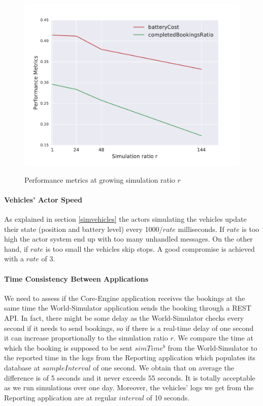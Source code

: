 \documentclass[12pt,a4paper]{article}
\begin{document}
\begin{figure}[h] 
  \centering
  \caption{Performance metrics at growing simulation ratio $r$}
  \vspace{-0.5em}
\includegraphics[scale=0.7]{./images/stability.pdf}
\label{fig:stability}
\end{figure}

\paragraph{Vehicles' Actor Speed} As explained in section \ref{simvehicles} the actors simulating the vehicles update their state (position and battery level) every 1000/$rate$ milliseconds. If $rate$ is too high the actor system end up with too many unhandled messages. On the other hand, if $rate$ is too small the vehicles skip stops. A good compromise is achieved with a $rate$ of 3.

\paragraph{Time Consistency Between Applications} We need to assess if the Core-Engine application receives the bookings at the same time the World-Simulator application sends the booking through a REST API. In fact, there might be some delay as the World-Simulator checks every second if it needs to send bookings, so if there is a real-time delay of one second it can increase proportionally to the simulation ratio $r$. We compare the time at which the booking is supposed to be sent $simTime^{b}$ from the World-Simulator to the reported time in the logs from the Reporting application which populates its database at $sampleInterval$ of one second. We obtain that on average the difference is of 5 seconds and it never exceeds 55 seconds. It is totally acceptable as we run simulations over one day. Moreover, the vehicles' logs we get from the Reporting application are at regular $interval$ of 10 seconds.
\end{document}
